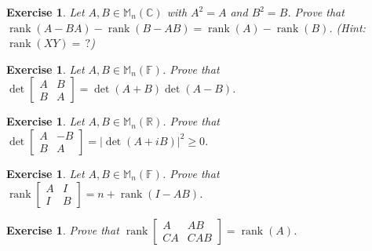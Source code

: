 \documentclass[12pt]{article}
\DeclareMathOperator{\Rank}{rank}
\theoremstyle{breakplain}
\theoremstyle{breakdef}
\newtheorem{ex}[subsubsection]{Exercise}
\theoremstyle{remark}
\begin{document}
\begin{ex}
    Let $A,B\in \mathbb{M}_n(\mathbb{C})$ with $A^2=A$ and $B^2=B$. Prove that $\Rank(A-BA)-\Rank(B-AB)=\Rank(A)-\Rank(B)$.
    (Hint: $\Rank(XY)=\,?$)
\end{ex}
\begin{ex}
    Let $A,B \in \mathbb{M}_n(\mathbb{F})$. Prove that $\det\begin{bmatrix}
        A & B \\
        B & A
    \end{bmatrix}=\det(A+B)\det(A-B)$.
\end{ex}
\begin{ex}
    Let $A,B \in \mathbb{M}_n(\mathbb{R})$. Prove that $\det\begin{bmatrix}
        A & -B \\
        B & A
    \end{bmatrix}=|\det(A+iB)|^2\geq 0$.
\end{ex}
\begin{ex}
    Let $A,B \in \mathbb{M}_n(\mathbb{F})$. Prove that $\Rank\begin{bmatrix}
        A & I \\
        I & B
    \end{bmatrix}=n+\Rank(I-AB)$.
\end{ex}
\begin{ex}
    Prove that $\Rank\begin{bmatrix}
        A & AB \\
        CA & CAB
    \end{bmatrix}=\Rank(A)$.
\end{ex}

\newpage
\end{document}
